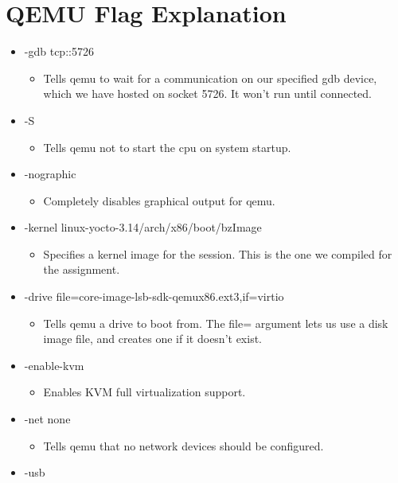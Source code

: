 \documentclass[10pt,onecolumn,journal,draftclsnofoot]{IEEEtran}
\begin{document}
\newpage

\section{QEMU Flag Explanation}

\begin{itemize}

\item -gdb tcp::5726
\begin{itemize}
\item{Tells qemu to wait for a communication on our specified gdb device, which we have hosted on socket 5726. It won't run until connected.}
\end{itemize}
\item -S
\begin{itemize}
\item{Tells qemu not to start the cpu on system startup.}
\end{itemize}
\item -nographic
\begin{itemize}
\item{Completely disables graphical output for qemu.}
\end{itemize}
\item -kernel linux-yocto-3.14/arch/x86/boot/bzImage
\begin{itemize}
\item{Specifies a kernel image for the session. This is the one we compiled for the assignment.}
\end{itemize}
\item -drive file=core-image-lsb-sdk-qemux86.ext3,if=virtio
\begin{itemize}
\item{Tells qemu a drive to boot from. The file= argument lets us use a disk image file, and creates one if it doesn't exist.}
\end{itemize}
\item -enable-kvm
\begin{itemize}
\item{Enables KVM full virtualization support.}
\end{itemize}
\item -net none
\begin{itemize}
\item{Tells qemu that no network devices should be configured.}
\end{itemize}
\item -usb
\begin{itemize}

\end{itemize}
\end{itemize}
\end{document}
